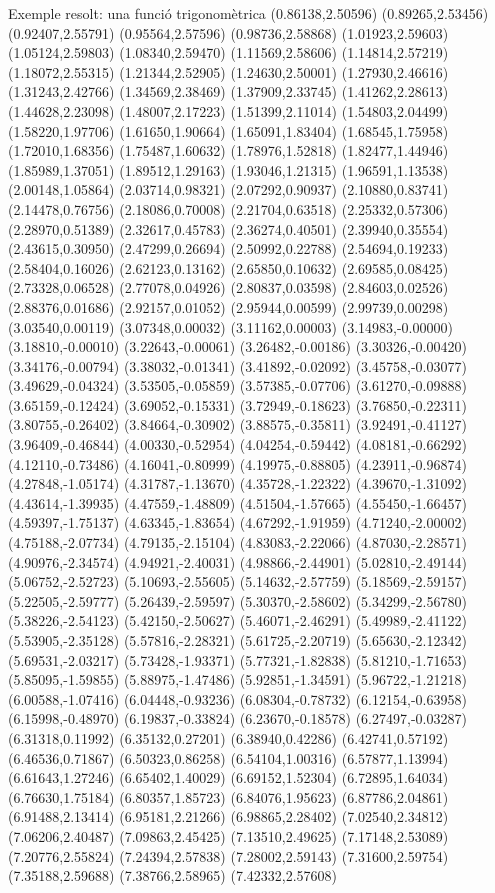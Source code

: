 \documentclass[11pt,a4paper]{article}
\begin{document}
\begin{fmex}{Exemple resolt: una funció trigonomètrica}
(0.86138,2.50596) (0.89265,2.53456) (0.92407,2.55791) (0.95564,2.57596) (0.98736,2.58868) (1.01923,2.59603) (1.05124,2.59803) (1.08340,2.59470) (1.11569,2.58606) (1.14814,2.57219) (1.18072,2.55315) (1.21344,2.52905) (1.24630,2.50001) (1.27930,2.46616) (1.31243,2.42766) (1.34569,2.38469) (1.37909,2.33745) (1.41262,2.28613) (1.44628,2.23098) (1.48007,2.17223) (1.51399,2.11014) (1.54803,2.04499) (1.58220,1.97706) (1.61650,1.90664) (1.65091,1.83404) (1.68545,1.75958) (1.72010,1.68356) (1.75487,1.60632) (1.78976,1.52818) (1.82477,1.44946) (1.85989,1.37051) (1.89512,1.29163) (1.93046,1.21315) (1.96591,1.13538) (2.00148,1.05864) (2.03714,0.98321) (2.07292,0.90937) (2.10880,0.83741) (2.14478,0.76756) (2.18086,0.70008) (2.21704,0.63518) (2.25332,0.57306) (2.28970,0.51389) (2.32617,0.45783) (2.36274,0.40501) (2.39940,0.35554) (2.43615,0.30950) (2.47299,0.26694) (2.50992,0.22788) (2.54694,0.19233) (2.58404,0.16026) (2.62123,0.13162) (2.65850,0.10632) (2.69585,0.08425) (2.73328,0.06528) (2.77078,0.04926) (2.80837,0.03598) (2.84603,0.02526) (2.88376,0.01686) (2.92157,0.01052) (2.95944,0.00599) (2.99739,0.00298) (3.03540,0.00119) (3.07348,0.00032) (3.11162,0.00003) (3.14983,-0.00000) (3.18810,-0.00010) (3.22643,-0.00061) (3.26482,-0.00186) (3.30326,-0.00420) (3.34176,-0.00794) (3.38032,-0.01341) (3.41892,-0.02092) (3.45758,-0.03077) (3.49629,-0.04324) (3.53505,-0.05859) (3.57385,-0.07706) (3.61270,-0.09888) (3.65159,-0.12424) (3.69052,-0.15331) (3.72949,-0.18623) (3.76850,-0.22311) (3.80755,-0.26402) (3.84664,-0.30902) (3.88575,-0.35811) (3.92491,-0.41127) (3.96409,-0.46844) (4.00330,-0.52954) (4.04254,-0.59442) (4.08181,-0.66292) (4.12110,-0.73486) (4.16041,-0.80999) (4.19975,-0.88805) (4.23911,-0.96874) (4.27848,-1.05174) (4.31787,-1.13670) (4.35728,-1.22322) (4.39670,-1.31092) (4.43614,-1.39935) (4.47559,-1.48809) (4.51504,-1.57665) (4.55450,-1.66457) (4.59397,-1.75137) (4.63345,-1.83654) (4.67292,-1.91959) (4.71240,-2.00002) (4.75188,-2.07734) (4.79135,-2.15104) (4.83083,-2.22066) (4.87030,-2.28571) (4.90976,-2.34574) (4.94921,-2.40031) (4.98866,-2.44901) (5.02810,-2.49144) (5.06752,-2.52723) (5.10693,-2.55605) (5.14632,-2.57759) (5.18569,-2.59157) (5.22505,-2.59777) (5.26439,-2.59597) (5.30370,-2.58602) (5.34299,-2.56780) (5.38226,-2.54123) (5.42150,-2.50627) (5.46071,-2.46291) (5.49989,-2.41122) (5.53905,-2.35128) (5.57816,-2.28321) (5.61725,-2.20719) (5.65630,-2.12342) (5.69531,-2.03217) (5.73428,-1.93371) (5.77321,-1.82838) (5.81210,-1.71653) (5.85095,-1.59855) (5.88975,-1.47486) (5.92851,-1.34591) (5.96722,-1.21218) (6.00588,-1.07416) (6.04448,-0.93236) (6.08304,-0.78732) (6.12154,-0.63958) (6.15998,-0.48970) (6.19837,-0.33824) (6.23670,-0.18578) (6.27497,-0.03287) (6.31318,0.11992) (6.35132,0.27201) (6.38940,0.42286) (6.42741,0.57192) (6.46536,0.71867) (6.50323,0.86258) (6.54104,1.00316) (6.57877,1.13994) (6.61643,1.27246) (6.65402,1.40029) (6.69152,1.52304) (6.72895,1.64034) (6.76630,1.75184) (6.80357,1.85723) (6.84076,1.95623) (6.87786,2.04861) (6.91488,2.13414) (6.95181,2.21266) (6.98865,2.28402) (7.02540,2.34812) (7.06206,2.40487) (7.09863,2.45425) (7.13510,2.49625) (7.17148,2.53089) (7.20776,2.55824) (7.24394,2.57838) (7.28002,2.59143) (7.31600,2.59754) (7.35188,2.59688) (7.38766,2.58965) (7.42332,2.57608) 
\end{fmex}
\end{document}
